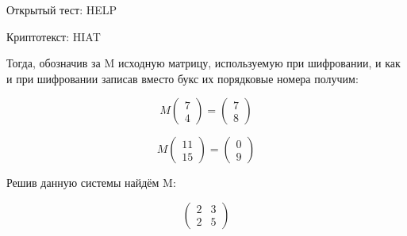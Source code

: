 \documentclass[10pt,a4paper]{article}
\begin{document}
Открытый тест: HELP

Криптотекст: HIAT

Тогда, обозначив за M исходную матрицу, используемую при шифровании,
и как и при шифровании записав вместо букс их порядковые номера
получим:

$$ M \begin{pmatrix} 7 \\ 4 \end{pmatrix} = 
\begin{pmatrix} 7 \\ 8 \end{pmatrix}$$

$$ M \begin{pmatrix} 11 \\ 15 \end{pmatrix} = 
\begin{pmatrix} 0 \\ 9 \end{pmatrix}$$

Решив данную системы найдём M:

$$\begin{pmatrix} 
2 & 3 \\
2 & 5
\end{pmatrix} $$
\end{document}
